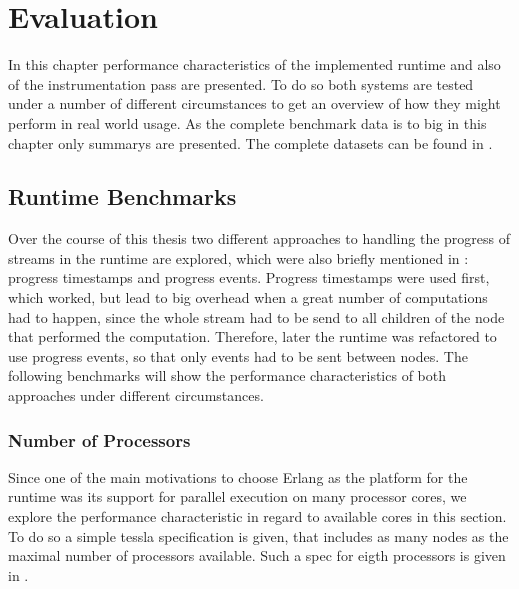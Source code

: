 %
\chapter{Evaluation}
\label{sec:evaluation}

In this chapter performance characteristics of the implemented runtime and also of the instrumentation pass are presented.
To do so both systems are tested under a number of different circumstances to get an overview of how they might perform in real world usage.
As the complete benchmark data is to big in this chapter only summarys are presented.
The complete datasets can be found in .

\section{Runtime Benchmarks}
\label{sec:evaluation:runtime_benchmarks}

Over the course of this thesis two different approaches to handling the progress of streams in the runtime are explored, which were also briefly mentioned in : progress timestamps and progress events.
Progress timestamps were used first, which worked, but lead to big overhead when a great number of computations had to happen, since the whole stream had to be send to all children of the node that performed the computation.
Therefore, later the runtime was refactored to use progress events, so that only events had to be sent between nodes.
The following benchmarks will show the performance characteristics of both approaches under different circumstances.

\subsection{Number of Processors}
\label{sec:evaluation:runtime_benchmarks:num_cores}

Since one of the main motivations to choose Erlang as the platform for the runtime was its support for parallel execution on many processor cores, we explore the performance characteristic in regard to available cores in this section.
To do so a simple \gls{tessla} specification is given, that includes as many nodes as the maximal number of processors available.
Such a spec for eigth processors is given in .

\begin{figure}
  
\end{figure}

